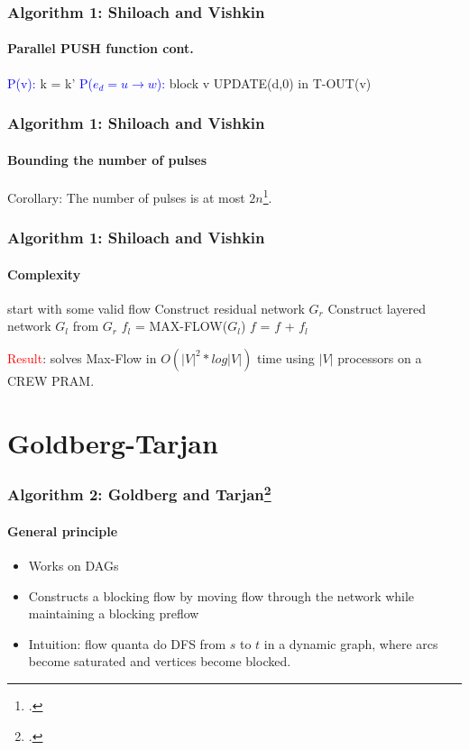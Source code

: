 \documentclass{beamer}
\begin{document}
\begin{frame}
\frametitle{Algorithm 1: Shiloach and Vishkin}
\framesubtitle{Parallel PUSH function cont.} 
\begin{algorithmic}[1]
	\State \textcolor{blue}{P(v):} k = k'
	\State \textcolor{blue}{P($e_d = u \rightarrow w$):}
		\State block v
		\State UPDATE(d,0) in T-OUT(v)
	\EndIf
\end{algorithmic}
\end{frame}

\begin{frame}
\frametitle{Algorithm 1: Shiloach and Vishkin}
\framesubtitle{Bounding the number of pulses} 
\begin{block}{Corollary:}
The number of pulses is at most $2n$\footcite{yossi81}.
\end{block}
\end{frame}

\begin{frame}
\frametitle{Algorithm 1: Shiloach and Vishkin}
\framesubtitle{Complexity} 
	\begin{algorithmic}[1]
	\State start with some valid flow 
	 \Comment{\textcolor{OliveGreen}{$O(\lvert V \rvert)$}}	
		\State Construct residual network $G_r$ \Comment{\textcolor{OliveGreen}{$O(\lvert V \rvert)$, $p=O(\lvert V \rvert)$}}
		\State Construct layered network $G_l$ from $G_r$ 
		\State $f_l$ = MAX-FLOW($G_l$)  \Comment{\textcolor{OliveGreen}{$O(\lvert V \rvert * log \lvert V \rvert)$}}
		\State $f$ = $f$ + $f_l$ \Comment{\textcolor{OliveGreen}{$O(\lvert V \rvert)$}}
	\EndWhile
	\EndFunction
	\end{algorithmic}
	
\pause
\textcolor{red}{Result}: solves Max-Flow in $O({\lvert V \rvert}^{2} * log \lvert V \rvert)$ time using $\lvert V \rvert$ processors on a CREW PRAM.
\end{frame}

\section{Goldberg-Tarjan}
\begin{frame}
\frametitle{Algorithm 2: Goldberg and Tarjan\footcite{goldberg89}}
\framesubtitle{General principle}
\begin{itemize}
	\item Works on DAGs
	\item Constructs a blocking flow by moving flow through the network while maintaining a blocking preflow	
	\item Intuition: flow quanta do DFS from $s$ to $t$ in a dynamic graph, where arcs become saturated and vertices become blocked.
\end{itemize} 
\end{frame}
\end{document}
